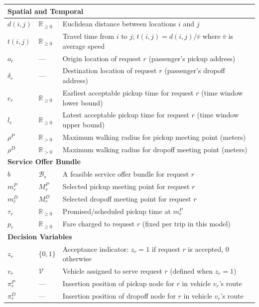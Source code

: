 \begin{longtable}{@{}lll@{}}
\multicolumn{3}{l}{\textbf{Spatial and Temporal}} \\
\midrule
$d(i,j)$ & $\mathbb{R}_{\geq 0}$ & Euclidean distance between locations $i$ and $j$ \\
$t(i,j)$ & $\mathbb{R}_{\geq 0}$ & Travel time from $i$ to $j$; $t(i,j) = d(i,j) / \bar{v}$ where $\bar{v}$ is average speed \\
$o_r$ & --- & Origin location of request $r$ (passenger's pickup address) \\
$\delta_r$ & --- & Destination location of request $r$ (passenger's dropoff address) \\
$e_r$ & $\mathbb{R}_{\geq 0}$ & Earliest acceptable pickup time for request $r$ (time window lower bound) \\
$l_r$ & $\mathbb{R}_{\geq 0}$ & Latest acceptable pickup time for request $r$ (time window upper bound) \\
$\rho^P$ & $\mathbb{R}_{>0}$ & Maximum walking radius for pickup meeting point (meters) \\
$\rho^D$ & $\mathbb{R}_{>0}$ & Maximum walking radius for dropoff meeting point (meters) \\
\midrule

\multicolumn{3}{l}{\textbf{Service Offer Bundle}} \\
\midrule
$b$ & $\mathcal{B}_r$ & A feasible service offer bundle for request $r$ \\
$m_r^P$ & $M_r^P$ & Selected pickup meeting point for request $r$ \\
$m_r^D$ & $M_r^D$ & Selected dropoff meeting point for request $r$ \\
$\tau_r$ & $\mathbb{R}_{\geq 0}$ & Promised/scheduled pickup time at $m_r^P$ \\
$p_r$ & $\mathbb{R}_{\geq 0}$ & Fare charged to request $r$ (fixed per trip in this model) \\
\midrule

\multicolumn{3}{l}{\textbf{Decision Variables}} \\
\midrule
$z_r$ & $\{0,1\}$ & Acceptance indicator: $z_r = 1$ if request $r$ is accepted, 0 otherwise \\
$v_r$ & $\mathcal{V}$ & Vehicle assigned to serve request $r$ (defined when $z_r = 1$) \\
$\pi_r^P$ & --- & Insertion position of pickup node for $r$ in vehicle $v_r$'s route \\
$\pi_r^D$ & --- & Insertion position of dropoff node for $r$ in vehicle $v_r$'s route \\
\midrule


\end{longtable}

